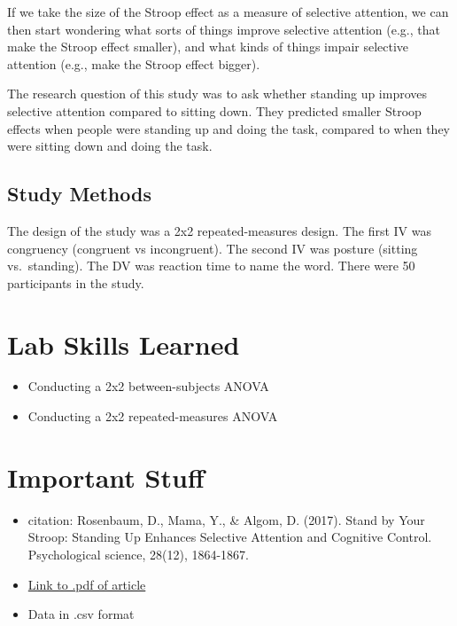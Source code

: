 \documentclass[
]{book}
\providecommand{\tightlist}{%
  \setlength{\itemsep}{0pt}\setlength{\parskip}{0pt}}
\begin{document}
If we take the size of the Stroop effect as a measure of selective attention, we can then start wondering what sorts of things improve selective attention (e.g., that make the Stroop effect smaller), and what kinds of things impair selective attention (e.g., make the Stroop effect bigger).

The research question of this study was to ask whether standing up improves selective attention compared to sitting down. They predicted smaller Stroop effects when people were standing up and doing the task, compared to when they were sitting down and doing the task.

\hypertarget{study-methods-2}{%
\subsection{Study Methods}\label{study-methods-2}}

The design of the study was a 2x2 repeated-measures design. The first IV was congruency (congruent vs incongruent). The second IV was posture (sitting vs.~standing). The DV was reaction time to name the word. There were 50 participants in the study.

\hypertarget{lab-skills-learned-4}{%
\section{Lab Skills Learned}\label{lab-skills-learned-4}}

\begin{itemize}
\tightlist
\item
  Conducting a 2x2 between-subjects ANOVA
\item
  Conducting a 2x2 repeated-measures ANOVA
\end{itemize}

\hypertarget{important-stuff-4}{%
\section{Important Stuff}\label{important-stuff-4}}

\begin{itemize}
\tightlist
\item
  citation: Rosenbaum, D., Mama, Y., \& Algom, D. (2017). Stand by Your Stroop: Standing Up Enhances Selective Attention and Cognitive Control. Psychological science, 28(12), 1864-1867.
\item
  \href{https://www.researchgate.net/profile/David_Rosenbaum6/publication/320070495_Stand_by_Your_Stroop_Standing_Up_Enhances_Selective_Attention_and_Cognitive_Control/links/5a82b4f10f7e9bda869fac5b/Stand-by-Your-Stroop-Standing-Up-Enhances-Selective-Attention-and-Cognitive-Control.pdf}{Link to .pdf of article}
\item
  Data in .csv format
\end{itemize}
\end{document}
